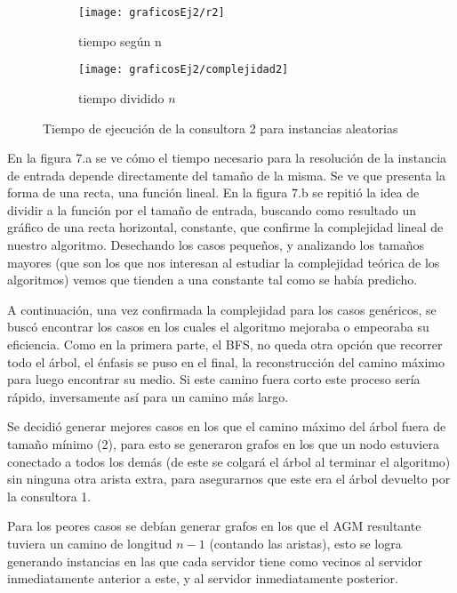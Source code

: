 \documentclass[A4paper,oneside,fleqn,11pt]{article}
\theoremstyle{definition}
\begin{document}
\begin{figure}[H] %
    \begin{subfigure}[b]{0.45\textwidth}
        \texttt{[image: graficosEj2/r2]}
        \caption[center]{tiempo según n}
        \label{ni se pa que sirve esto}
    \end{subfigure}
    \begin{subfigure}[b]{0.45\textwidth}
        \texttt{[image: graficosEj2/complejidad2]}
        \caption{tiempo dividido $n$}
        \label{ni se pa que sirve esto}
    \end{subfigure}
    \caption{Tiempo de ejecución de la consultora 2 para instancias aleatorias}
\end{figure}

En la figura 7.a se ve cómo el tiempo necesario para la resolución de la instancia de entrada depende directamente del tamaño de la misma. Se ve que presenta la forma de una recta, una función lineal. En la figura 7.b se repitió la idea de dividir a la función por el tamaño de entrada, buscando como resultado un gráfico de una recta horizontal, constante, que confirme la complejidad lineal de nuestro algoritmo. Desechando los casos pequeños, y analizando los tamaños mayores (que son los que nos interesan al estudiar la complejidad teórica de los algoritmos) vemos que tienden a una constante tal como se había predicho.

A continuación, una vez confirmada la complejidad para los casos genéricos, se buscó encontrar los casos en los cuales el algoritmo mejoraba o empeoraba su eficiencia. Como en la primera parte, el BFS, no queda otra opción que recorrer todo el árbol, el énfasis se puso en el final, la reconstrucción del camino máximo para luego encontrar su medio. Si este camino fuera corto este proceso sería rápido, inversamente así para un camino más largo.

Se decidió generar mejores casos en los que el camino máximo del árbol fuera de tamaño mínimo (2), para esto se generaron grafos en los que un nodo estuviera conectado a todos los demás (de este se colgará el árbol al terminar el algoritmo) sin ninguna otra arista extra, para asegurarnos que este era el árbol devuelto por la consultora 1.

Para los peores casos se debían generar grafos en los que el AGM resultante tuviera un camino de longitud $n-1$ (contando las aristas), esto se logra generando instancias en las que cada servidor tiene como vecinos al servidor inmediatamente anterior a este, y al servidor inmediatamente posterior.
\end{document}
